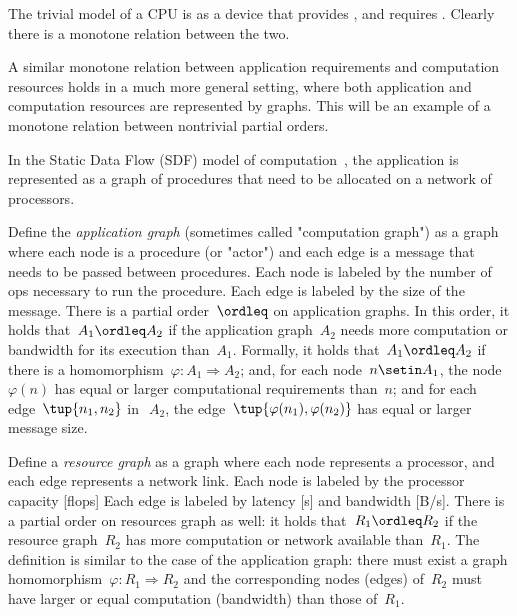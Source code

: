 The trivial model of a CPU is as a device that provides , and requires .
Clearly there is a monotone relation between the two.

\begin{figure}[h]
    \centering
    \caption{}
\end{figure}

A similar monotone relation between application requirements and computation resources holds in a much more general setting, where both application and computation resources are represented by graphs.
This will be an example of a monotone relation between nontrivial partial orders.

In the Static Data Flow (SDF) model of computation~\cite[Chapter 3]{sriram00,lee10}, the application is represented as a graph of procedures that need to be allocated on a network of processors.

\begin{figure*}[h]
    \centering
    \caption{}
\end{figure*}

Define the\emph{ application graph }(sometimes called "computation graph") as a graph where each node is a procedure (or "actor") and each edge is a message that needs to be passed between procedures.
Each node is labeled by the number of ops necessary to run the procedure.
Each edge is labeled by the size of the message.
There is a partial order~$\ordleq$ on application graphs.
In this order, it holds that~$A_1 \ordleq A_2$ if the application graph~$A_2$ needs more computation or bandwidth for its execution than~$A_1$.
Formally, it holds that~$A_1 \ordleq A_2$
if there is a homomorphism~$\varphi \colon A_1  \Rightarrow A_2$; and, for each node~$n \setin A_1$, the node~$\varphi(n)$ has equal or larger computational requirements than~$n$; and for each edge~$\tup{n_1,n_2}$
in~$~A_2$, the edge~$\tup{\varphi (n_1), \varphi (n_2)}$ has equal or larger message size.

Define a \emph{resource graph} as a graph where each node represents a processor, and each edge represents a network link.
Each node is labeled by the processor capacity [flops] Each edge is labeled by latency [s] and bandwidth [B/s].
There is a partial order on resources graph as well: it holds that~$R_1 \ordleq R_2$ if the resource graph~$R_2$ has more computation or network available than~$R_1$.
The definition is similar to the case of the application graph: there must exist a graph homomorphism~$\varphi \colon R_1  \Rightarrow R_2$
and the corresponding nodes (edges) of~$R_2$ must have larger or equal computation (bandwidth) than those of~$R_1$.


